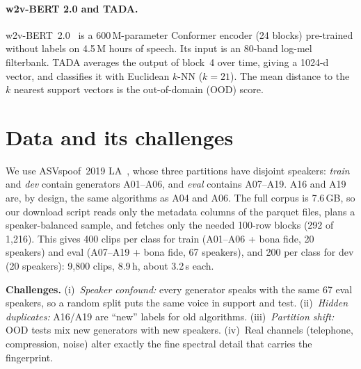 \documentclass[11pt,a4paper]{article}
\begin{document}
\paragraph{w2v-BERT 2.0 and TADA.} w2v-BERT~2.0~\cite{barrault2023seamless,chung2021w2vbert}
is a 600\,M-parameter Conformer encoder (24 blocks) pre-trained without labels on 4.5\,M hours
of speech. Its input is an 80-band log-mel filterbank. TADA averages the output of block~4
over time, giving a 1024-d vector, and classifies it with Euclidean $k$-NN ($k=21$). The mean
distance to the $k$ nearest support vectors is the out-of-domain (OOD) score.

\section{Data and its challenges}
We use ASVspoof~2019 LA~\cite{wang2020asvspoof}, whose three partitions have disjoint
speakers: \emph{train} and \emph{dev} contain generators A01--A06, and \emph{eval} contains
A07--A19. A16 and A19 are, by design, the same algorithms as A04 and A06. The full corpus is
7.6\,GB, so our download script reads only the metadata columns of the parquet files, plans
a speaker-balanced sample, and fetches only the needed 100-row blocks (292 of 1{,}216). This
gives 400 clips per class for train (A01--A06 + bona fide, 20 speakers) and eval
(A07--A19 + bona fide, 67 speakers), and 200 per class for dev (20 speakers): 9{,}800 clips,
8.9\,h, about 3.2\,s each.

\textbf{Challenges.} (i)~\emph{Speaker confound:} every generator speaks with the same 67
eval speakers, so a random split puts the same voice in support and test. (ii)~\emph{Hidden
duplicates:} A16/A19 are ``new'' labels for old algorithms. (iii)~\emph{Partition shift:} OOD
tests mix new generators with new speakers. (iv)~Real channels (telephone, compression,
noise) alter exactly the fine spectral detail that carries the fingerprint.

\end{document}
